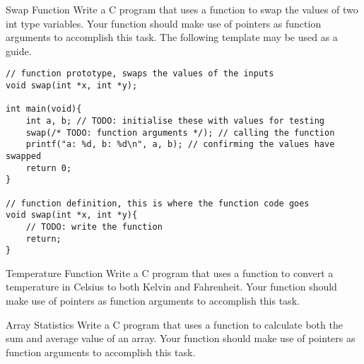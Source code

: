 \documentclass{pass}
\begin{document}
\begin{task}{Swap Function}{}
Write a C program that uses a function to swap the values of two int type variables. Your function should make use of pointers as function arguments to accomplish this task. The following template may be used as a guide.

\begin{lstlisting}[style=CStyle]
// function prototype, swaps the values of the inputs
void swap(int *x, int *y);

int main(void){
	int a, b; // TODO: initialise these with values for testing
	swap(/* TODO: function arguments */); // calling the function
	printf("a: %d, b: %d\n", a, b); // confirming the values have swapped
	return 0;
}

// function definition, this is where the function code goes
void swap(int *x, int *y){
	// TODO: write the function
	return;
}
\end{lstlisting}

\end{task}

\begin{task}{Temperature Function}{}
Write a C program that uses a function to convert a temperature in Celsius to both Kelvin and Fahrenheit. Your function should make use of pointers as function arguments to accomplish this task.
\\[8pt]
\end{task}

\begin{task}{Array Statistics}{}
Write a C program that uses a function to calculate both the sum and average value of an array. Your function should make use of pointers as function arguments to accomplish this task.
\end{task}
\end{document}
